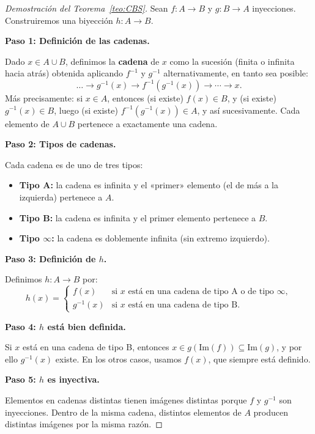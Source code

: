 \begin{proof}[Demostración del Teorema~\ref{teo:CBS}]
Sean $f: A \to B$ y $g: B \to A$ inyecciones. Construiremos una biyección $h: A \to B$.

\medskip
\textbf{Paso 1: Definición de las cadenas.}

Dado $x \in A \cup B$, definimos la \textbf{cadena} de $x$ como la sucesión (finita o infinita hacia atrás) obtenida aplicando $f^{-1}$ y $g^{-1}$ alternativamente, en tanto sea posible:
\[
  \ldots \to g^{-1}(x) \to f^{-1}(g^{-1}(x)) \to \cdots \to x.
\]
Más precisamente: si $x \in A$, entonces (si existe) $f(x) \in B$, y (si existe) $g^{-1}(x) \in B$, luego (si existe) $f^{-1}(g^{-1}(x)) \in A$, y así sucesivamente. Cada elemento de $A \cup B$ pertenece a exactamente una cadena.

\medskip
\textbf{Paso 2: Tipos de cadenas.}

Cada cadena es de uno de tres tipos:
\begin{itemize}[leftmargin=2em]
  \item \textbf{Tipo A:} la cadena es infinita y el «primer» elemento (el de más a la izquierda) pertenece a $A$.
  \item \textbf{Tipo B:} la cadena es infinita y el primer elemento pertenece a $B$.
  \item \textbf{Tipo $\infty$:} la cadena es doblemente infinita (sin extremo izquierdo).
\end{itemize}

\medskip
\textbf{Paso 3: Definición de $h$.}

Definimos $h: A \to B$ por:
\[
  h(x) = \begin{cases}
    f(x) & \text{si } x \text{ está en una cadena de tipo A o de tipo } \infty, \\
    g^{-1}(x) & \text{si } x \text{ está en una cadena de tipo B.}
  \end{cases}
\]

\medskip
\textbf{Paso 4: $h$ está bien definida.}

Si $x$ está en una cadena de tipo B, entonces $x \in g(\mathrm{Im}(f)) \subseteq \mathrm{Im}(g)$, y por ello $g^{-1}(x)$ existe. En los otros casos, usamos $f(x)$, que siempre está definido.

\medskip
\textbf{Paso 5: $h$ es inyectiva.}

Elementos en cadenas distintas tienen imágenes distintas porque $f$ y $g^{-1}$ son inyecciones. Dentro de la misma cadena, distintos elementos de $A$ producen distintas imágenes por la misma razón.


\end{proof}
